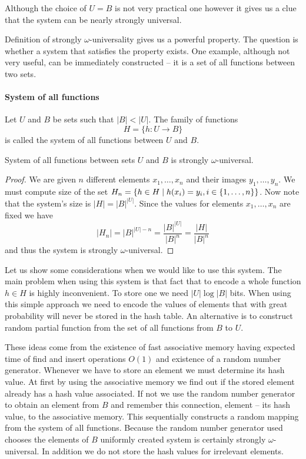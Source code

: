 Although the choice of $U = B$ is not very practical one however it gives us a clue that the system can be nearly strongly universal.

Definition of strongly $\omega$-universality gives us a powerful property. The question is whether a system that satisfies the property exists. One example, although not very useful, can be immediately constructed -- it is a set of all functions between two sets.

\paragraph{System of all functions}
\begin{definition}
Let $U$ and $B$ be sets such that $|B| < |U|$. The family of functions
\[
H = \{h: U \rightarrow B \}
\]
is called the system of all functions between $U$ and $B$.
\end{definition}

\begin{remark}
System of all functions between sets $U$ and $B$ is strongly $\omega$-universal.
\end{remark}
\begin{proof}
We are given $n$ different elements $x_1, \dots, x_n$ and their images $y_1, \dots, y_n$. We must compute size of the set $H_n = \lbrace h \in H \mid h(x_i) = y_i, i \in \lbrace 1, \dots, n\rbrace \rbrace$. Now note that the system's size is $|H| = {|B|}^{|U|}$. Since the values for elements $x_1, \dots, x_n$ are fixed we have \[ |H_n| = {|B|}^{|U| - n} = \frac{{|B|}^{|U|}}{{|B|}^{n}} = \frac{|H|}{|B|^n} \] and thus the system is strongly $\omega$-universal.
\end{proof}

Let us show some considerations when we would like to use this system. The main problem when using this system is that fact that to encode a whole function $h \in H$ is highly inconvenient. To store one we need $|U| \log |B|$ bits. When using this simple approach we need to encode the values of elements that with great probability will never be stored in the hash table. An alternative is to construct random partial function from the set of all functions from $B$ to $U$. 

These ideas come from the existence of fast associative memory having expected time of find and insert operations $O(1)$ and existence of a random number generator. Whenever we have to store an element we must determine its hash value. At first by using the associative memory we find out if the stored element already has a hash value associated. If not we use the random number generator to obtain an element from $B$ and remember this connection, element -- its hash value, to the associative memory. This sequentially constructs a random mapping from the system of all functions. Because the random number generator used chooses the elements of $B$ uniformly created system is certainly strongly $\omega$-universal. In addition we do not store the hash values for irrelevant elements. 

